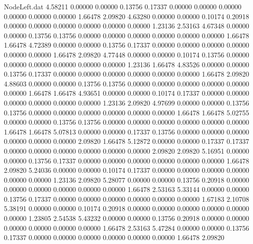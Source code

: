 \begin{filecontents}{NodeLeft.dat}
   4.58211    0.00000    0.00000     0.13756    0.17337    0.00000    0.00000    0.00000    0.00000    0.00000    0.00000    1.66478    2.09820
   4.63280    0.00000    0.00000     0.10174    0.20918    0.00000    0.00000    0.00000    0.00000    0.00000    0.00000    1.23136    2.53163
   4.67348    0.00000    0.00000     0.13756    0.13756    0.00000    0.00000    0.00000    0.00000    0.00000    0.00000    1.66478    1.66478
   4.72389    0.00000    0.00000     0.13756    0.17337    0.00000    0.00000    0.00000    0.00000    0.00000    0.00000    1.66478    2.09820
   4.77448    0.00000    0.00000     0.10174    0.13756    0.00000    0.00000    0.00000    0.00000    0.00000    0.00000    1.23136    1.66478
   4.83526    0.00000    0.00000     0.13756    0.17337    0.00000    0.00000    0.00000    0.00000    0.00000    0.00000    1.66478    2.09820
   4.88603    0.00000    0.00000     0.13756    0.13756    0.00000    0.00000    0.00000    0.00000    0.00000    0.00000    1.66478    1.66478
   4.93651    0.00000    0.00000     0.10174    0.17337    0.00000    0.00000    0.00000    0.00000    0.00000    0.00000    1.23136    2.09820
   4.97699    0.00000    0.00000     0.13756    0.13756    0.00000    0.00000    0.00000    0.00000    0.00000    0.00000    1.66478    1.66478
   5.02755    0.00000    0.00000     0.13756    0.13756    0.00000    0.00000    0.00000    0.00000    0.00000    0.00000    1.66478    1.66478
   5.07813    0.00000    0.00000     0.17337    0.13756    0.00000    0.00000    0.00000    0.00000    0.00000    0.00000    2.09820    1.66478
   5.12872    0.00000    0.00000     0.17337    0.17337    0.00000    0.00000    0.00000    0.00000    0.00000    0.00000    2.09820    2.09820
   5.16951    0.00000    0.00000     0.13756    0.17337    0.00000    0.00000    0.00000    0.00000    0.00000    0.00000    1.66478    2.09820
   5.24036    0.00000    0.00000     0.10174    0.17337    0.00000    0.00000    0.00000    0.00000    0.00000    0.00000    1.23136    2.09820
   5.28077    0.00000    0.00000     0.13756    0.20918    0.00000    0.00000    0.00000    0.00000    0.00000    0.00000    1.66478    2.53163
   5.33144    0.00000    0.00000     0.13756    0.17337    0.00000    0.00000    0.00000    0.00000    0.00000    0.00000    1.67183    2.10708
   5.38191    0.00000    0.00000     0.10174    0.20918    0.00000    0.00000    0.00000    0.00000    0.00000    0.00000    1.23805    2.54538
   5.43232    0.00000    0.00000     0.13756    0.20918    0.00000    0.00000    0.00000    0.00000    0.00000    0.00000    1.66478    2.53163
   5.47284    0.00000    0.00000     0.13756    0.17337    0.00000    0.00000    0.00000    0.00000    0.00000    0.00000    1.66478    2.09820

\end{filecontents}
